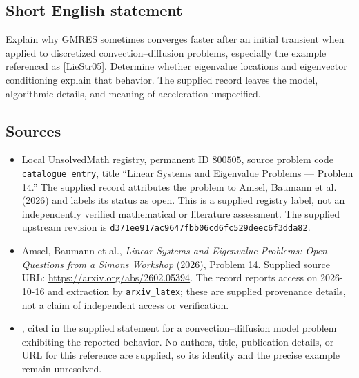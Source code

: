 \documentclass[11pt]{article}
\begin{document}
\subsection{Short English statement}
Explain why GMRES sometimes converges faster after an initial transient when applied to discretized convection--diffusion problems, especially the example referenced as [LieStr05]. Determine whether eigenvalue locations and eigenvector conditioning explain that behavior. The supplied record leaves the model, algorithmic details, and meaning of acceleration unspecified.
\subsection{Sources}
\begin{itemize}
\item Local UnsolvedMath registry, permanent ID \(800505\), source problem code \texttt{catalogue entry}, title ``Linear Systems and Eigenvalue Problems --- Problem 14.'' The supplied record attributes the problem to Amsel, Baumann et al. (2026) and labels its status as open. This is a supplied registry label, not an independently verified mathematical or literature assessment. The supplied upstream revision is \texttt{d371ee917ac9647fbb06cd6fc529deec6f3dda82}.
\item Amsel, Baumann et al., \emph{Linear Systems and Eigenvalue Problems: Open Questions from a Simons Workshop} (2026), Problem 14. Supplied source URL: \url{https://arxiv.org/abs/2602.05394}. The record reports access on 2026-10-16 and extraction by \texttt{arxiv\_latex}; these are supplied provenance details, not a claim of independent access or verification.
\item [LieStr05], cited in the supplied statement for a convection--diffusion model problem exhibiting the reported behavior. No authors, title, publication details, or URL for this reference are supplied, so its identity and the precise example remain unresolved.
\end{itemize}
\end{document}
